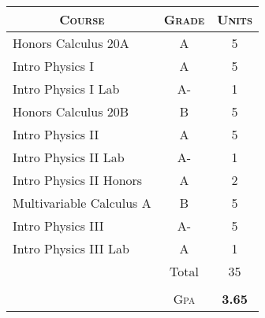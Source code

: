 \documentclass[a4paper,10pt]{article} %
\begin{document}
\begin{center}
\begin{tabular}{lcc}
\multicolumn{1}{c}{\textsc{Course}} & \textsc{Grade} & \textsc{Units}\\ 
\hline
Honors Calculus 20A & A & 5\\
Intro Physics I & A & 5\\
Intro Physics I Lab & A- & 1\\
Honors Calculus 20B & B & 5\\
Intro Physics II & A & 5\\
Intro Physics II Lab & A- & 1\\
Intro Physics II Honors & A & 2\\
Multivariable Calculus A & B & 5\\
Intro Physics III & A- & 5\\
Intro Physics III Lab & A & 1\\  
& Total & 35\\
& &\\\cline{2-3}
& \textsc{Gpa} & \textbf{3.65}
\end{tabular}
\end{center}

\end{document}
